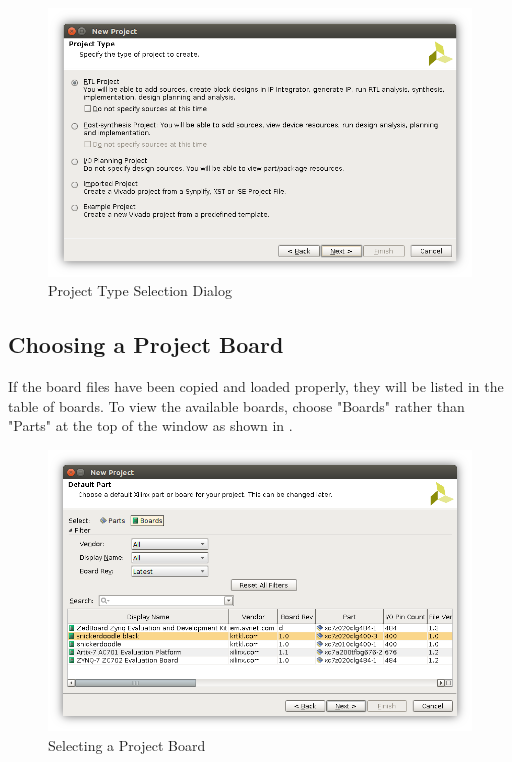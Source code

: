 \begin{figure}
	\centering
	\includegraphics{images/New_Project_Type.png}
	\caption{Project Type Selection Dialog}
	\label{fig:newprojecttype}
\end{figure}


\newpage

\subsection{Choosing a Project Board}
If the board files have been copied and loaded properly, they will be listed in the table of boards. To view the available boards, choose "Boards" rather than "Parts" at the top of the window as shown in . \\

\begin{figure}
	\centering
	\includegraphics{images/Project_Boards.png}
	\caption{Selecting a Project Board}
	\label{fig:vivadoprojectboard}
\end{figure}

